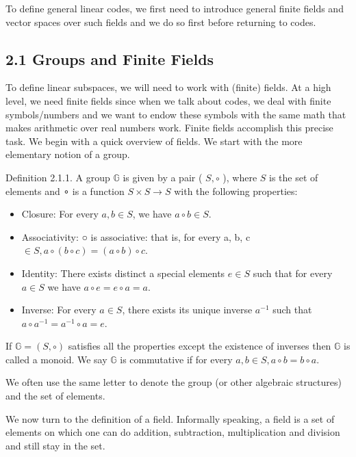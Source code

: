 \documentclass[10pt]{article}
\begin{document}
To define general linear codes, we first need to introduce general finite fields and vector spaces over such fields and we do so first before returning to codes.

\subsection*{2.1 Groups and Finite Fields}
To define linear subspaces, we will need to work with (finite) fields. At a high level, we need finite fields since when we talk about codes, we deal with finite symbols/numbers and we want to endow these symbols with the same math that makes arithmetic over real numbers work. Finite fields accomplish this precise task. We begin with a quick overview of fields. We start with the more elementary notion of a group.

Definition 2.1.1. A group $\mathbb{G}$ is given by a pair ( $S, \circ$ ), where $S$ is the set of elements and ∘ is a function $S \times S \rightarrow S$ with the following properties:

\begin{itemize}
  \item[-] Closure: For every $a, b \in S$, we have $a \circ b \in S$.
  \item[-] Associativity: ○ is associative: that is, for every a, b, c $\in S, a \circ(b \circ c)=(a \circ b) \circ c$.
\end{itemize}

\begin{itemize}
  \item[-] Identity: There exists distinct a special elements $e \in S$ such that for every $a \in S$ we have $a \circ e=e \circ a=a$.
  \item[-] Inverse: For every $a \in S$, there exists its unique inverse $a^{-1}$ such that $a \circ a^{-1}=a^{-1} \circ a=e$.
\end{itemize}

If $\mathbb{G}=(S, \circ)$ satisfies all the properties except the existence of inverses then $\mathbb{G}$ is called a monoid. We say $\mathbb{G}$ is commutative if for every $a, b \in S, a \circ b=b \circ a$.

We often use the same letter to denote the group (or other algebraic structures) and the set of elements.

We now turn to the definition of a field. Informally speaking, a field is a set of elements on which one can do addition, subtraction, multiplication and division and still stay in the set.
\end{document}
